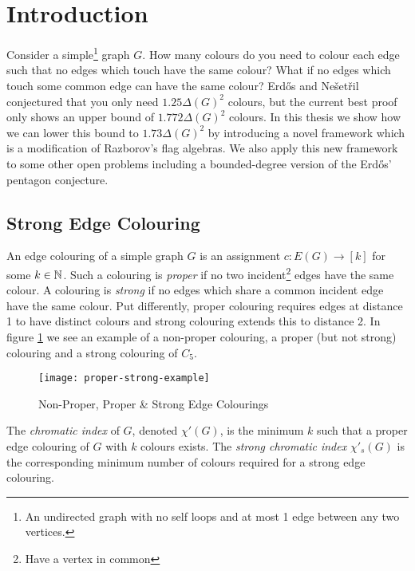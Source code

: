 \chapter*{Introduction}

Consider a simple\footnote{An undirected graph with no self loops and at most 1 edge between any two
vertices.} graph $G$. How many colours do you need to colour each edge such that no edges which touch
have the same colour? What if no edges which touch some common edge can have the same colour?
Erd\H{o}s and Nešetřil conjectured that you only need $1.25\Delta(G)^2$ colours, but
the current best proof only shows an upper bound of $1.772\Delta(G)^2$ colours. In this thesis
we show how we can lower this bound to $1.73\Delta(G)^2$ by introducing a novel framework
which is a modification of Razborov's flag algebras. We also apply this new framework
to some other open problems including a bounded-degree version of the
Erd\H{o}s' pentagon conjecture.

\section*{Strong Edge Colouring}
\label{sec:intro_strong_edge_coloring}

An edge colouring of a simple graph $G$ is an assignment $c\colon E(G) \to [k]$
for some $k\in\mathbb{N}$. Such a colouring is \textit{proper} if no two incident\footnote{Have a vertex in common}
edges have the same colour.
A colouring is \textit{strong} if no edges which share a common incident edge have
the same colour. Put differently, proper colouring requires edges at distance 1 to have distinct
colours and strong colouring extends this to distance 2.
In figure \ref{fig:proper-strong-example} we see an example of a non-proper colouring,
a proper (but not strong) colouring and a strong colouring of $C_5$.

\begin{figure}[h]
    \centering
    \texttt{[image: proper-strong-example]}
    \caption{Non-Proper, Proper \& Strong Edge Colourings}
    \label{fig:proper-strong-example}
\end{figure}

The \textit{chromatic index} of $G$, denoted $\chi'(G)$, is the minimum $k$ such that a proper edge
colouring of $G$ with $k$ colours exists. The \textit{strong chromatic index} $\chi'_s(G)$
is the corresponding minimum number of colours required for a strong edge colouring.

